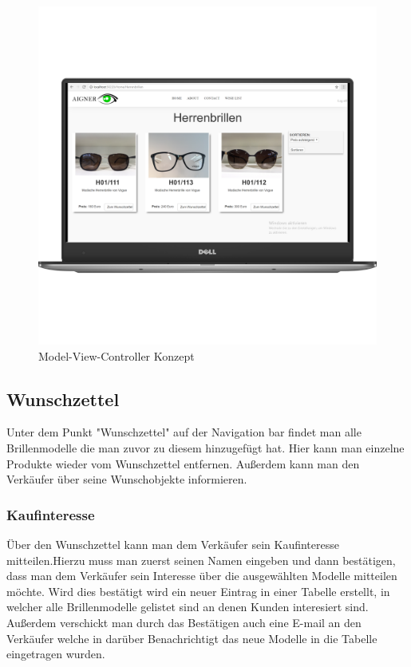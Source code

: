 \begin{figure}[H]
\begin{center}
	\includegraphics[scale=.2]{images/Brillen.png}
\end{center}
	\caption{Model-View-Controller Konzept}
	\label{fig:sample}
\end{figure}


\subsection{Wunschzettel}
Unter dem Punkt "Wunschzettel" auf der Navigation bar findet man alle Brillenmodelle die man zuvor zu diesem hinzugefügt hat. Hier kann man einzelne Produkte wieder vom Wunschzettel entfernen. Außerdem kann man den Verkäufer über seine Wunschobjekte informieren.

\subsubsection{Kaufinteresse}
Über den Wunschzettel kann man dem Verkäufer sein Kaufinteresse mitteilen.Hierzu muss man zuerst seinen Namen eingeben und dann bestätigen, dass man dem Verkäufer sein Interesse über die ausgewählten Modelle mitteilen möchte. Wird dies bestätigt wird ein neuer Eintrag in einer Tabelle erstellt, in welcher alle Brillenmodelle gelistet sind an denen Kunden interesiert sind. Außerdem verschickt man durch das Bestätigen auch eine E-mail an den Verkäufer welche in darüber Benachrichtigt das neue Modelle in die Tabelle eingetragen wurden.


